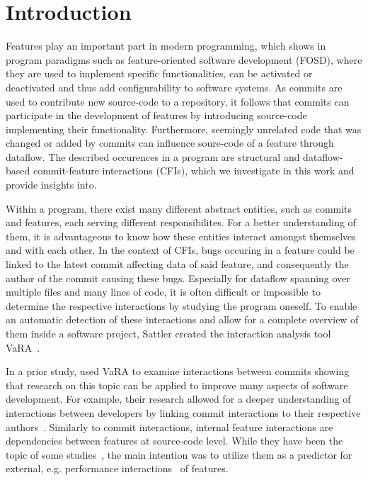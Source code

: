 \chapter{Introduction}\label{ch:introduction}

Features play an important part in modern programming, which shows in program paradigms such as feature-oriented software development (FOSD), where they are used to implement specific functionalities, can be activated or deactivated and thus add configurability to software systems.
As commits are used to contribute new source-code to a repository, it follows that commits can participate in the development of features by introducing source-code implementing their functionality. 
Furthermore, seemingly unrelated code that was changed or added by commits can influence soure-code of a feature through dataflow.
The described occurences in a program are structural and dataflow-based commit-feature interactions (CFIs), which we investigate in this work and provide insights into. 

Within a program, there exist many different abstract entities, such as commits and features, each serving different responsibilites.
For a better understanding of them, it is advantageous to know how these entities interact amongst themselves and with each other.
In the context of CFIs, bugs occuring in a feature could be linked to the latest commit affecting data of said feature, and consequently the author of the commit causing these bugs.
Especially for dataflow spanning over multiple files and many lines of code, it is often difficult or impossible to determine the respective interactions by studying the program oneself.
To enable an automatic detection of these interactions and allow for a complete overview of them inside a software project, Sattler created the interaction analysis tool VaRA~\cite{VaRA2023}.

In a prior study, \citet{sattler2023seal} used VaRA to examine interactions between commits showing that research on this topic can be applied to improve many aspects of software development.
For example, their research allowed for a deeper understanding of interactions between developers by linking commit interactions to their respective authors~\cite{sattler2023seal}. 
Similarly to commit interactions, internal feature interactions are dependencies between features at source-code level. 
While they have been the topic of some studies~\cite{kolesnikov2017relation}, the main intention was to utilize them as a predictor for external, e.g. performance interactions~\cite{siegmund2012predicting} of features.

